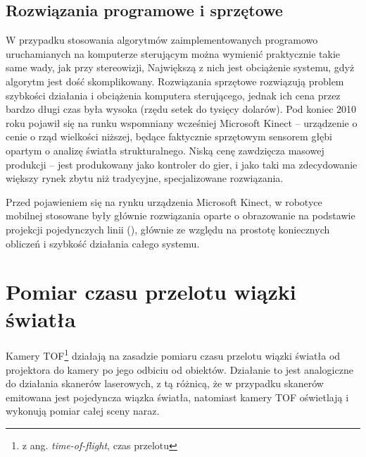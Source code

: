 \subsection{Rozwiązania programowe i sprzętowe}

W przypadku stosowania algorytmów zaimplementowanych programowo uruchamianych na
komputerze sterującym można wymienić praktycznie takie same wady, jak przy
stereowizji, Największą z nich jest obciążenie systemu, gdyż algorytm jest
dość skomplikowany. Rozwiązania sprzętowe rozwiązują problem szybkości działania
i obciążenia komputera sterującego, jednak ich cena przez bardzo długi czas
była wysoka (rzędu setek do tysięcy dolarów). Pod koniec 2010 roku pojawił się
na runku wspomniany wcześniej Microsoft Kinect -- urządzenie o cenie o
rząd wielkości niższej, będące faktycznie sprzętowym sensorem głębi opartym o
analizę światła strukturalnego. Niską cenę zawdzięcza masowej produkcji -- jest
produkowany jako kontroler do gier, i jako taki ma zdecydowanie większy rynek
zbytu niż tradycyjne, specjalizowane rozwiązania.

Przed pojawieniem się na rynku urządzenia Microsoft Kinect, w robotyce mobilnej
stosowane były głównie rozwiązania oparte o obrazowanie na podstawie projekcji
pojedynczych linii (\cite{120445,5246792}), głównie ze względu na prostotę
koniecznych obliczeń i szybkość działania całego systemu.


\section{Pomiar czasu przelotu wiązki światła}

Kamery TOF\footnote{z ang. {\it time-of-flight}, czas przelotu} działają na zasadzie
pomiaru czasu przelotu wiązki światła od projektora do kamery po jego odbiciu od
obiektów. Działanie to jest analogiczne do działania skanerów laserowych, z tą różnicą,
że w przypadku skanerów emitowana jest pojedyncza wiązka światła, natomiast kamery TOF
oświetlają i wykonują pomiar całej sceny naraz.

